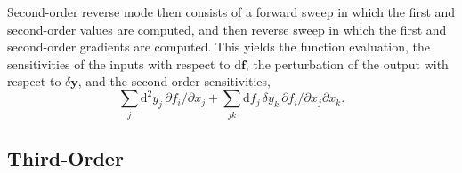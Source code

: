Second-order reverse mode then consists of a forward sweep in which the first and 
second-order values are computed, and then reverse sweep in which the first and 
second-order gradients are computed.  This  yields the function evaluation, the 
sensitivities of the inputs with respect to $\mathrm{d} \mathbf{f}$, the perturbation of the 
output with respect to $\delta \mathbf{y}$, and the second-order sensitivities,
%
\begin{equation*}
\sum_{j} \mathrm{d}^{2} y_{j} \, \partial f_{i} / \partial x_{j}
+ \sum_{jk} \mathrm{d} f_{j} \, \delta y_{k} \, \partial f_{i} / \partial x_{j} \partial x_{k}.
\end{equation*}

\subsection{Third-Order}

